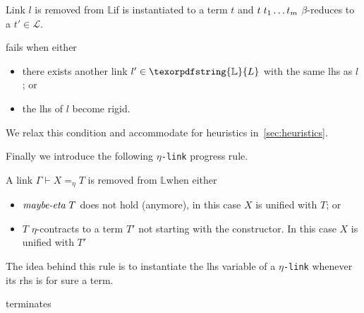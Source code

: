 \documentclass[sigconf,natbib=false,review]{acmart}
\newcommand{\appsep}{\ensuremath{\textcolor{lightgray}{\cdot}}}
\newcommand{\llambda}{\ensuremath{\mathcal{L}}\xspace}
\newcommand{\linkMacro}[1]{\ensuremath{#1}\texttt{-link}\xspace}
\newcommand{\linkbeta}{\linkMacro{\llambda}}
\newcommand{\linketa} {\linkMacro{\eta}}
\newcommand{\linketaM}[3]{\ensuremath{#1 \vdash #2 =_\eta #3}}
\newcommand{\lhs}{lhs\xspace}
\newcommand{\rhs}{rhs\xspace}
\newcommand{\linkStore}{\texorpdfstring{\ensuremath{\mathbb{L}}\xspace}{L}}
\begin{document}
\begin{definition}[\progBetaRH]
  Link $l$ is removed from
  \linkStore if \rhsBetaHead is instantiated to a term $t$ and
  $t \appsep t_1 \ldots t_m$ $\beta$-reduces to a $t' \in \llambda$.
  \label{def:progBetaRH}
\end{definition}

\begin{definition}[\progBetaFail]
  \progress fails when either
  \begin{itemize}
  \item
  there exists another link $l' \in \linkStore$ with the same \lhs as $l$; or
  \item the \lhs of $l$
  become rigid.
  \end{itemize}
  \label{def:progBetaFail}
\end{definition}
\noindent
We relax this condition and accommodate for
heuristics in~\ref{sec:heuristics}.

Finally
we introduce the following
\linketa progress rule.

\newcommand{\progressetaright}{\emph{$\eta$-progress-\rhs}\xspace}
\begin{definition}[\progressetaright]\label{def:progressetaright} A link
\linketaM{\Gamma}{X}{T} is removed from \linkStore when either 
\begin{itemize}
  \item $\emph{maybe-eta}~T$ does not hold (anymore), in this case $X$ is unified
        with $T$; or
  \item $T$ $\eta$-contracts to a term $T'$ not starting with the 
        constructor. In this case $X$ is unified with $T'$
\end{itemize}
\end{definition}

The idea behind this rule is to instantiate the \lhs variable of a \linketa
whenever its \rhs is for sure a \wellb term.

\begin{lemma}
   terminates
\end{lemma}
\end{document}
